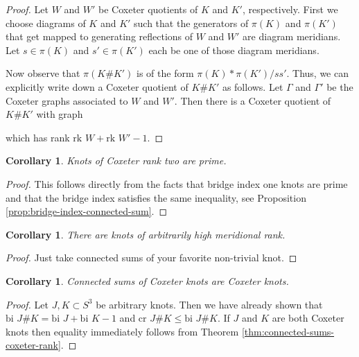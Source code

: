\documentclass[a4paper]{article}
\newtheorem{corollary}[theorem]{Corollary}
\theoremstyle{definition}
\begin{document}
\begin{proof}
Let $W$ and $W'$ be Coxeter quotients of $K$ and $K'$, respectively. First we choose diagrams of $K$ and $K'$ such that the generators of $\pi(K)$ and $\pi(K')$ that get mapped to generating reflections of $W$ and $W'$ are diagram meridians. Let $s \in \pi(K)$ and $s' \in \pi(K')$ each be one of those diagram meridians.

Now observe that $\pi(K\#K')$ is of the form $\pi(K) * \pi(K') / ss'$. Thus, we can explicitly write down a Coxeter quotient of $K\#K'$ as follows. Let $\Gamma$ and $\Gamma'$ be the Coxeter graphs associated to $W$ and $W'$. Then there is a Coxeter quotient of $K\#K'$ with graph
\begin{center}
\end{center}
which has rank $\text{rk } W + \text{rk } W' - 1$. 
\end{proof}

\begin{corollary}
Knots of Coxeter rank two are prime.
\end{corollary}

\begin{proof}
This follows directly from the facts that bridge index one knots are prime and that the bridge index satisfies the same inequality, see Proposition \ref{prop:bridge-index-connected-sum}.
\end{proof}

\begin{corollary}
There are knots of arbitrarily high meridional rank.
\end{corollary}

\begin{proof}
Just take connected sums of your favorite non-trivial knot.
\end{proof}

\begin{corollary}
Connected sums of Coxeter knots are Coxeter knots.
\end{corollary}

\begin{proof}
Let $J, K \subset S^3$ be arbitrary knots. Then we have already shown that $\text{bi } J\#K = \text{bi } J + \text{bi } K - 1$ and $\text{cr } J\#K \leq \text{bi } J\#K$. If $J$ and $K$ are both Coxeter knots then equality immediately follows from Theorem \ref{thm:connected-sums-coxeter-rank}.
\end{proof}
\end{document}
